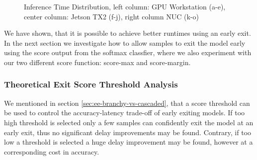 \begin{figure}
\begin{minipage}{.33\textwidth}
		\hfill
		\hfill
	\end{minipage}
	\caption[Platform Inference Time of \gls{dnn}s]{Inference Time Distribution, left column: GPU Workstation (a-e), center column: Jetson TX2 (f-j), right column NUC (k-o)}
	\label{fig:inference-time-dist}
\end{figure}

We have shown, that it is possible to achieve better runtimes using an early exit. In the next section we investigate how to allow samples to exit the model early using the score output from the softmax classfier, where we also experiment with our two different score function: score-max and score-margin.

\subsubsection{Theoretical Exit Score Threshold Analysis}

We mentioned in section \ref{sec:ee-branchy-vs-cascaded}, that a score threshold can be used to control the accuracy-latency trade-off of early exiting models. If too high threshold is selected only a few samples can confidently exit the model at an early exit, thus no significant delay improvements may be found. Contrary, if too low a threshold is selected a huge delay improvement may be found, however at a corresponding cost in accuracy. 

